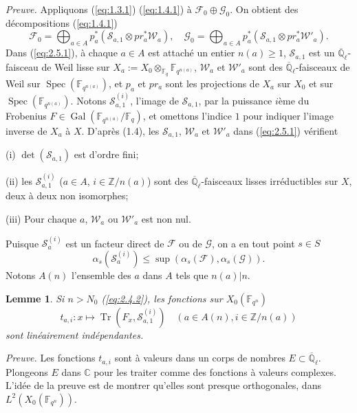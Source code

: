 \documentclass[11pt,a4paper]{article}
\theoremstyle{plain}
\newtheorem{lemma}[theorem]{Lemme}
\theoremstyle{definition}
\DeclareMathOperator{\Spec}{Spec}
\DeclareMathOperator{\Gal}{Gal}
\DeclareMathOperator{\tr}{Tr}
\begin{document}
\noindent\textit{Preuve.} Appliquons (\ref{eq:1.3.1}) (\ref{eq:1.4.1}) \`a $\mathcal{F}_0 \oplus \mathcal{G}_0$. On obtient des d\'ecompositions (\ref{eq:1.4.1})
\begin{equation}\label{eq:2.5.1}
\mathcal{F}_0 = \bigoplus_{a \in A} p_a^*(\mathcal{S}_{a,1} \otimes pr_a^* \mathcal{W}_a), \quad \mathcal{G}_0 = \bigoplus_{a \in A} p_a^*(\mathcal{S}_{a,1} \otimes pr_a^* \mathcal{W}'_a).
\end{equation}
Dans (\ref{eq:2.5.1}), \`a chaque $a \in A$ est attach\'e un entier $n(a) \geq 1$, $\mathcal{S}_{a,1}$ est un $\overline{\mathbb{Q}}_\ell$-faisceau de Weil lisse sur $X_a := X_0 \otimes_{\mathbb{F}_q} \mathbb{F}_{q^{n(a)}}$, $\mathcal{W}_a$ et $\mathcal{W}'_a$ sont des $\overline{\mathbb{Q}}_\ell$-faisceaux de Weil sur $\Spec(\mathbb{F}_{q^{n(a)}})$, et $p_a$ et $pr_a$ sont les projections de $X_a$ sur $X_0$ et sur $\Spec(\mathbb{F}_{q^{n(a)}})$. Notons $\mathcal{S}_{a,1}^{(i)}$, l'image de $\mathcal{S}_{a,1}$, par la puissance $i$\`eme du Frobenius $F \in \Gal(\mathbb{F}_{q^{n(a)}}/\mathbb{F}_q)$, et omettons l'indice $1$ pour indiquer l'image inverse de $X_a$ \`a $X$. D'apr\`es (1.4), les $\mathcal{S}_{a,1}$, $\mathcal{W}_a$ et $\mathcal{W}'_a$ dans (\ref{eq:2.5.1}) v\'erifient

(i) $\det(\mathcal{S}_{a,1})$ est d'ordre fini;

(ii) les $\mathcal{S}_{a,1}^{(i)}$ ($a \in A$, $i \in \mathbb{Z}/n(a)$) sont des $\overline{\mathbb{Q}}_\ell$-faisceaux lisses irr\'eductibles sur $X$, deux \`a deux non isomorphes;

(iii) Pour chaque $a$, $\mathcal{W}_a$ ou $\mathcal{W}'_a$ est non nul.

Puisque $\mathcal{S}_a^{(i)}$ est un facteur direct de $\mathcal{F}$ ou de $\mathcal{G}$, on a en tout point $s \in S$
\[
\alpha_s(\mathcal{S}_a^{(i)}) \leq \sup(\alpha_s(\mathcal{F}), \alpha_s(\mathcal{G})).
\]
Notons $A(n)$ l'ensemble des $a$ dans $A$ tels que $n(a) | n$.

\begin{lemma}\label{lem:2.6}
Si $n > N_0$ (\ref{eq:2.4.2}), les fonctions sur $X_0(\mathbb{F}_{q^n})$
\[
t_{a,i}: x \mapsto \tr(F_x, \mathcal{S}_{a,1}^{(i)}) \quad (a \in A(n), i \in \mathbb{Z}/n(a))
\]
sont lin\'eairement ind\'ependantes.
\end{lemma}

\noindent\textit{Preuve.} Les fonctions $t_{a,i}$ sont \`a valeurs dans un corps de nombres $E \subset \overline{\mathbb{Q}}_\ell$. Plongeons $E$ dans $\mathbb{C}$ pour les traiter comme des fonctions \`a valeurs complexes. L'id\'ee de la preuve est de montrer qu'elles sont presque orthogonales, dans $L^2(X_0(\mathbb{F}_{q^n}))$.
\end{document}
